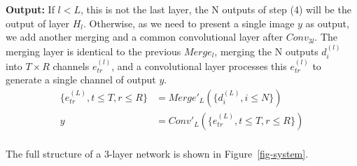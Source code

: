 \vspace{1mm}
\noindent
\textbf{Output:} If $l < L$, this is not the last layer, the N outputs of step (4) will be the output of layer $H_l$. Otherwise, as we need to present a single image $y$ as output, we add another merging and a common convolutional layer after $Conv_{3l}$. The merging layer is identical to the previous $Merge_l$, merging the N outputs $d_i^{(l)}$ into $T\times R$ channels $e_{tr}^{(l)}$, and a convolutional layer processes this $e_{tr}^{(l)}$ to generate a single channel of output $y$. 
\begin{equation}\label{eq:7}
    \begin{split}
        \{e_{tr}^{(L)},t\le T,r\le R\} &= Merge'_{L}(\{d_i^{(L)},i\le N\})\\
        y &= Conv'_{L}(\{e_{tr}^{(L)},t\le T,r\le R\} )\\
\end{split}
\end{equation}

The full structure of a 3-layer network is shown in Figure~\ref{fig-system}.




